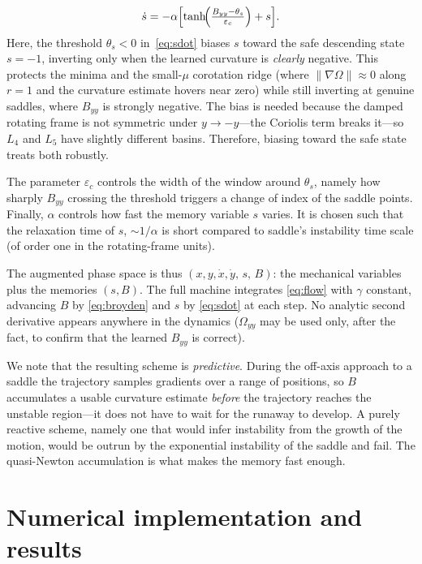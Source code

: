 \documentclass[aip,preprint,amsmath,amssymb,floatfix]{revtex4-2}
\begin{document}
\begin{equation}
	\dot s = -\alpha\Bigl[\tanh\!\Bigl(\tfrac{B_{yy}-\theta_s}{\varepsilon_c}\Bigr)+s
	\Bigr].
	\label{eq:sdot}
\end{equation}
Here, the
threshold $\theta_s<0$ in~\eqref{eq:sdot} biases $s$ toward the safe descending
state $s=-1$, inverting only when the learned curvature is \emph{clearly} negative.
This protects the minima and the small-$\mu$ corotation ridge (where
$\lVert\nabla\Omega\rVert\approx0$ along $r=1$ and the curvature estimate hovers
near zero) while still inverting at genuine saddles, where $B_{yy}$ is strongly
negative. The bias is needed because the damped rotating frame is not symmetric
under $y\to-y$---the Coriolis term breaks it---so $L_4$ and $L_5$ have slightly
different basins. Therefore, biasing toward the safe state treats both robustly.

The parameter $\varepsilon_c$ controls the width of the window around $\theta_s$, namely how 
sharply $B_{yy}$ crossing the threshold triggers a change of index of the saddle points. Finally, 
$\alpha$ controls how fast the memory variable $s$ varies. It is chosen such that the relaxation time of $s$, $\sim 1/{\alpha}$ is short 
compared to saddle's instability time scale (of order one in the rotating-frame units).  

The augmented phase space is thus $(x,y,\dot x,\dot y,\,s,\,B)$: the 
mechanical variables plus the memories $(s,B)$. The full machine integrates
\eqref{eq:flow} with $\gamma$ constant, advancing $B$ by
\eqref{eq:broyden} and $s$ by \eqref{eq:sdot} at each step. No
analytic second derivative appears anywhere in the dynamics ($\Omega_{yy}$ may be used
only, after the fact, to confirm that the learned $B_{yy}$ is correct).

We note that the resulting scheme is \emph{predictive}. During the
off-axis approach to a saddle the trajectory samples gradients over a range of
positions, so $B$ accumulates a usable curvature estimate \emph{before} the
trajectory reaches the unstable region---it does not have to wait for the runaway to
develop. A purely reactive scheme, namely one that would infer instability from the growth of
the motion, would be outrun by the exponential instability of the saddle and fail. The
quasi-Newton accumulation is what makes the memory fast enough. 

\section{Numerical implementation and results}\label{sec:params}
\end{document}
